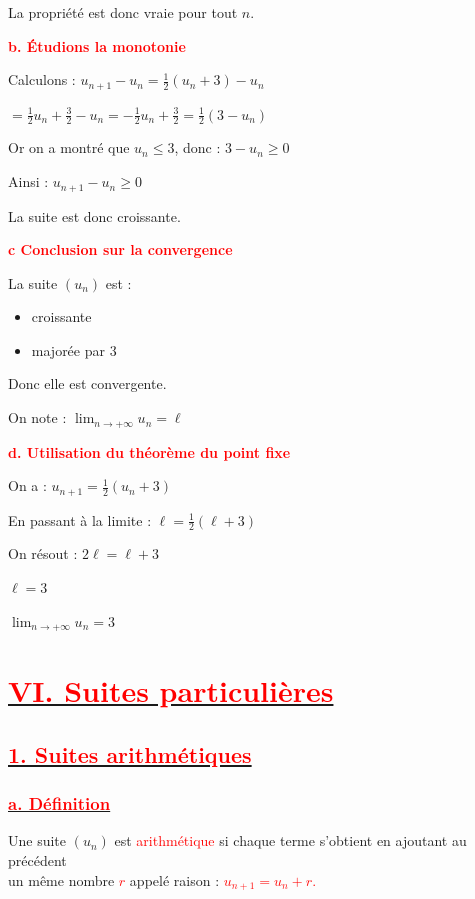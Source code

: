 \documentclass[12pt,a4paper]{article}
\begin{document}
La propriété est donc vraie pour tout $n$.

\bigskip

\textbf{\textcolor{red}{b. Étudions la monotonie}}

Calculons :
\(
u_{n+1}-u_n
=
\frac{1}{2}(u_n+3)-u_n
\)

\(
=
\frac{1}{2}u_n+\frac{3}{2}-u_n
=
-\frac{1}{2}u_n+\frac{3}{2}
=
\frac{1}{2}(3-u_n)
\)

Or on a montré que $u_n \leq 3$, donc :
\(
3-u_n \geq 0
\)

Ainsi :
\(
u_{n+1}-u_n \geq 0
\)

La suite est donc croissante.

\bigskip

\textbf{\textcolor{red}{c Conclusion sur la convergence}}

La suite $(u_n)$ est :

\begin{itemize}
\item croissante
\item majorée par 3
\end{itemize}

Donc elle est convergente.

On note :
\(
\lim_{n\to+\infty} u_n = \ell
\)

\bigskip

\textbf{\textcolor{red}{d. Utilisation du théorème du point fixe}}

On a :
\(
u_{n+1}=\frac{1}{2}(u_n+3)
\)

En passant à la limite :
\(
\ell=\frac{1}{2}(\ell+3)
\)

On résout :
\(
2\ell=\ell+3
\)

\(
\ell=3
\)


\(
\boxed{\lim_{n\to+\infty} u_n = 3}
\)



\section*{\underline{\textbf{\textcolor{red}{VI. Suites particulières}}}}
\subsection*{\underline{\textbf{\textcolor{red}{1. Suites arithmétiques}}}}
\subsubsection*{\underline{\textbf{\textcolor{red}{a. Définition}}}}
Une suite $\left(u_{n}\right)$ est \textcolor{red}{arithmétique} si chaque terme s'obtient en ajoutant au précédent\\ un même nombre \textcolor{red}{$r$} appelé raison : 
\textcolor{red}{$u_{n+1}=u_{n}+r.$} 
\end{document}
